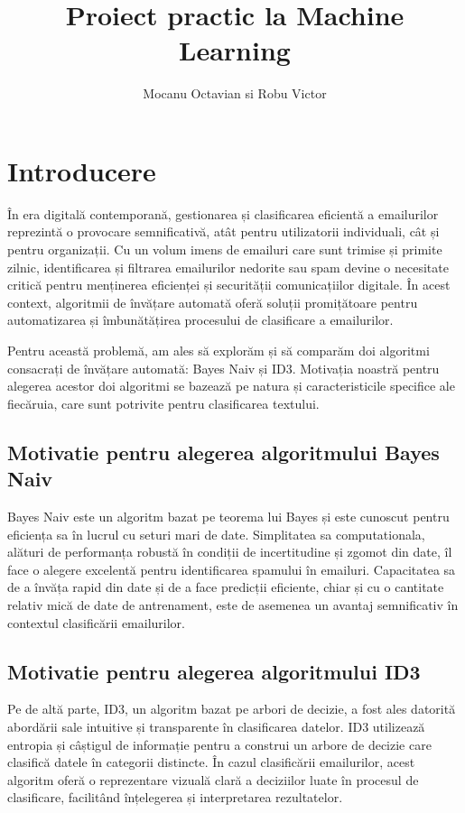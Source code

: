 \documentclass{article}
\title{Proiect practic la Machine Learning}
\author{Mocanu Octavian si Robu Victor}
\begin{document}
\maketitle



\section{Introducere}
    În era digitală contemporană, gestionarea și clasificarea eficientă a emailurilor reprezintă o provocare semnificativă, atât pentru utilizatorii individuali, cât și pentru organizații. Cu un volum imens de emailuri care sunt trimise și primite zilnic, identificarea și filtrarea emailurilor nedorite sau spam devine o necesitate critică pentru menținerea eficienței și securității comunicațiilor digitale. În acest context, algoritmii de învățare automată oferă soluții promițătoare pentru automatizarea și îmbunătățirea procesului de clasificare a emailurilor.

Pentru această problemă, am ales să explorăm și să comparăm doi algoritmi consacrați de învățare automată: Bayes Naiv și ID3. Motivația noastră pentru alegerea acestor doi algoritmi se bazează pe natura și caracteristicile specifice ale fiecăruia, care sunt potrivite pentru clasificarea textului.

\subsection{Motivatie pentru alegerea algoritmului Bayes Naiv}
Bayes Naiv este un algoritm bazat pe teorema lui Bayes și este cunoscut pentru eficiența sa în lucrul cu seturi mari de date. Simplitatea sa computationala, alături de performanța robustă în condiții de incertitudine și zgomot din date, îl face o alegere excelentă pentru identificarea spamului în emailuri. Capacitatea sa de a învăța rapid din date și de a face predicții eficiente, chiar și cu o cantitate relativ mică de date de antrenament, este de asemenea un avantaj semnificativ în contextul clasificării emailurilor.

\subsection{Motivatie pentru alegerea algoritmului ID3}
Pe de altă parte, ID3, un algoritm bazat pe arbori de decizie, a fost ales datorită abordării sale intuitive și transparente în clasificarea datelor. ID3 utilizează entropia și câștigul de informație pentru a construi un arbore de decizie care clasifică datele în categorii distincte. În cazul clasificării emailurilor, acest algoritm oferă o reprezentare vizuală clară a deciziilor luate în procesul de clasificare, facilitând înțelegerea și interpretarea rezultatelor.
\end{document}
